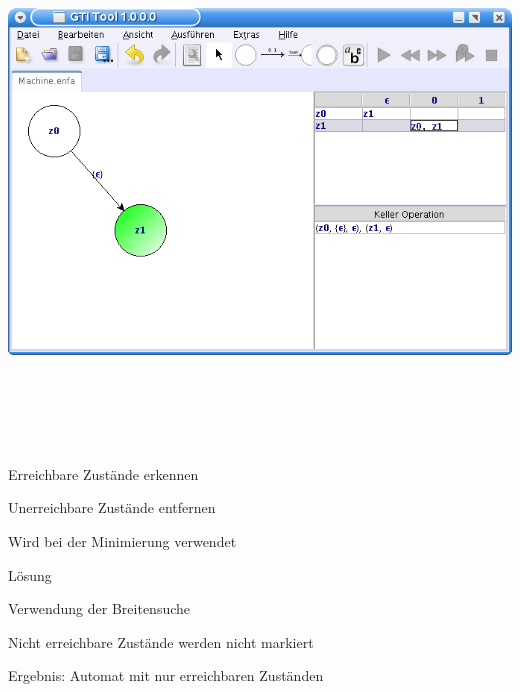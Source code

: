 {
  \begin{center}
    \includegraphics[height=14cm]{../images/machine_table.png}
  \end{center}
}


{
    \begin{itemgroup}{}
	\item Erreichbare Zustände erkennen
	\item Unerreichbare Zustände entfernen
	\item Wird bei der Minimierung verwendet
    \end{itemgroup}

    \begin{itemgroup}{Lösung}
	\item Verwendung der Breitensuche
	\item Nicht erreichbare Zustände werden nicht markiert
	\item Ergebnis: Automat mit nur erreichbaren Zuständen
	\end{itemgroup}
    
    \vfill{}
}



